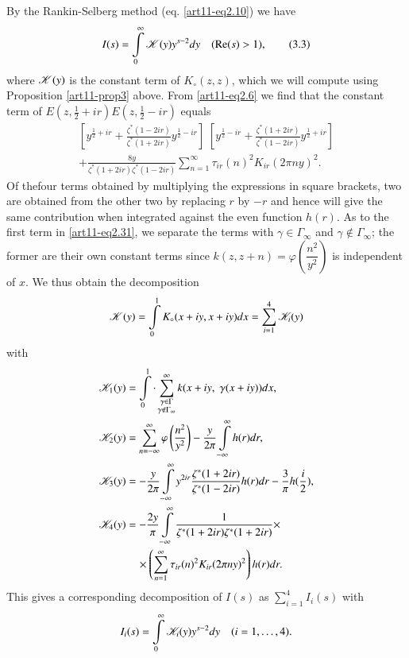 By the Rankin-Selberg method (eq. \eqref{art11-eq2.10}) we have 
\begin{equation*}
I(s) = \int\limits^\infty_0 \mathscr{K} (y) y^{s-2} dy \quad (\operatorname{Re} (s) >1), \tag{3.3} \label{art11-eq3.3}
\end{equation*}
where $\mathscr{K}(y)$ is the constant term of $K_\circ (z,z)$, which we will compute using Proposition \eqref{art11-prop3} above. From \eqref{art11-eq2.6} we find that the constant term of $E(z, \frac{1}{2} +ir) E (z, \frac{1}{2} - ir)$ equals 
\begin{align*}
\left[y^{\frac{1}{2} + ir} + \frac{\zeta^{\ast} (1-2 ir)}{\zeta^\ast (1+ 2 ir)} y^{\frac{1}{2}  - ir} \right] \; \left[y^{\frac{1}{2} - ir} + \frac{\zeta^\ast(1+ 2 ir)}{\zeta^\ast (1-2i r)} y^{\frac{1}{2} + ir}\right]\\
+ \frac{8y}{\zeta^\ast (1+ 2 ir) \zeta^\ast (1-2 ir)} \sum\limits_{n =1}^\infty \tau_{ir} (n)^2 K_{ir} (2 \pi n y)^2.
\end{align*}
Of the\pageoriginale four terms obtained by multiplying the expressions in square brackets, two are obtained from the other two by replacing $r$ by $-r$ and hence will give the same contribution when integrated against the even function $h(r)$. As to the first term in \eqref{art11-eq2.31}, we separate the terms with $\gamma \in \Gamma_\infty$ and $\gamma \not\in \Gamma_\infty$; the former are their own constant terms since $k(z,z+n) = \varphi \left(\dfrac{n^2}{y^2} \right)$ is independent of $x$. We thus obtain the decomposition 
$$
\mathscr{K}(y) = \int\limits^1_0 K_\circ (x+ iy, x + iy) dx = \sum\limits^4_{i=1} \mathscr{K}_i(y)
$$
with 
\begin{align*}
\mathscr{K}_1 (y) &= \int\limits^1_0  \cdot \sum\limits^\infty_{\substack{\gamma \in \Gamma \\ \gamma \not\in \Gamma_\infty}} k (x+ iy, \; \gamma (x+ iy)) dx, \\
\mathscr{K}_2 (y) & = \sum\limits^\infty_{n = - \infty} \varphi \left(\frac{n^2}{y^2} \right) -\frac{y}{2\pi}
 \int\limits^\infty_{-\infty} h(r) dr,\\
\mathscr{K}_3 (y) & = -\frac{y}{2\pi} \int\limits^\infty_{-\infty} y^{2ir} \frac{\zeta^\ast (1+2 ir)}{\zeta^\ast (1-2ir)} h(r) dr - \frac{3}{\pi} h(\frac{i}{2}), \\
\mathscr{K}_4 (y) & = -  \frac{2y}{\pi} \int\limits^\infty_{-\infty} \frac{1}{\zeta^\ast (1+ 2 ir) \zeta^\ast (1+ 2 ir)} \times \\
& \quad \times \left(\sum\limits^\infty_{n=1} \tau_{ir} (n)^2 K_{ir}(2 \pi n y)^2 \right) h(r) dr. 
\end{align*}
This gives a corresponding decomposition of $I(s)$ as $\sum\limits^4_{i=1} I_i(s)$ with 
$$
I_i (s) = \int\limits^\infty_0 \mathscr{K}_i (y) y^{s-2} dy \quad (i=1, \ldots, 4).
$$

